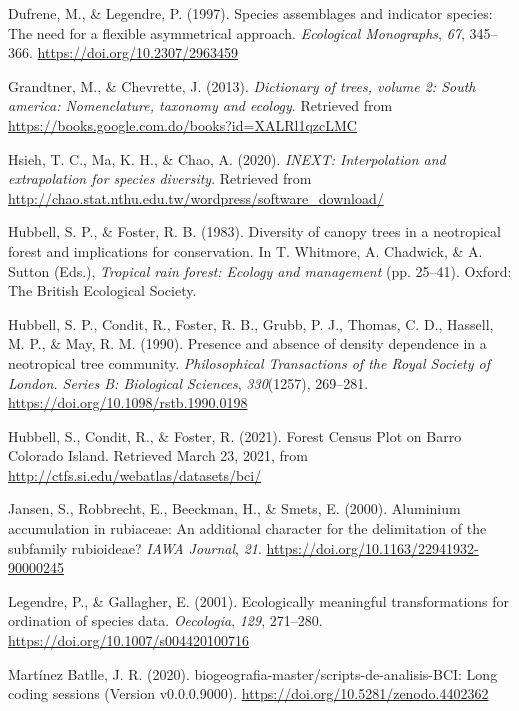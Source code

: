 \documentclass[11pt,]{article}
\begin{document}
\hypertarget{ref-dufrene_legendre}{}
Dufrene, M., \& Legendre, P. (1997). Species assemblages and indicator
species: The need for a flexible asymmetrical approach. \emph{Ecological
Monographs}, \emph{67}, 345--366. \url{https://doi.org/10.2307/2963459}

\hypertarget{ref-grandtner2013dictionary}{}
Grandtner, M., \& Chevrette, J. (2013). \emph{Dictionary of trees,
volume 2: South america: Nomenclature, taxonomy and ecology}. Retrieved
from \url{https://books.google.com.do/books?id=XALRl1qzcLMC}

\hypertarget{ref-inext_chao}{}
Hsieh, T. C., Ma, K. H., \& Chao, A. (2020). \emph{INEXT: Interpolation
and extrapolation for species diversity}. Retrieved from
\url{http://chao.stat.nthu.edu.tw/wordpress/software_download/}

\hypertarget{ref-hubell_foster_1983}{}
Hubbell, S. P., \& Foster, R. B. (1983). Diversity of canopy trees in a
neotropical forest and implications for conservation. In T. Whitmore, A.
Chadwick, \& A. Sutton (Eds.), \emph{Tropical rain forest: Ecology and
management} (pp. 25--41). Oxford: The British Ecological Society.

\hypertarget{ref-hubell_et_all_1990}{}
Hubbell, S. P., Condit, R., Foster, R. B., Grubb, P. J., Thomas, C. D.,
Hassell, M. P., \& May, R. M. (1990). Presence and absence of density
dependence in a neotropical tree community. \emph{Philosophical
Transactions of the Royal Society of London. Series B: Biological
Sciences}, \emph{330}(1257), 269--281.
\url{https://doi.org/10.1098/rstb.1990.0198}

\hypertarget{ref-web_bci}{}
Hubbell, S., Condit, R., \& Foster, R. (2021). Forest Census Plot on
Barro Colorado Island. Retrieved March 23, 2021, from
\url{http://ctfs.si.edu/webatlas/datasets/bci/}

\hypertarget{ref-article}{}
Jansen, S., Robbrecht, E., Beeckman, H., \& Smets, E. (2000). Aluminium
accumulation in rubiaceae: An additional character for the delimitation
of the subfamily rubioideae? \emph{IAWA Journal}, \emph{21}.
\url{https://doi.org/10.1163/22941932-90000245}

\hypertarget{ref-legendre_galllagher_2001}{}
Legendre, P., \& Gallagher, E. (2001). Ecologically meaningful
transformations for ordination of species data. \emph{Oecologia},
\emph{129}, 271--280. \url{https://doi.org/10.1007/s004420100716}

\hypertarget{ref-jose_ramon_martinez_batlle_2020_4402362}{}
Martínez Batlle, J. R. (2020).
biogeografia-master/scripts-de-analisis-BCI: Long coding sessions
(Version v0.0.0.9000). \url{https://doi.org/10.5281/zenodo.4402362}
\end{document}
